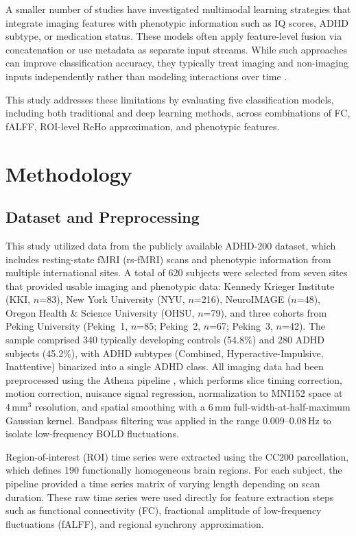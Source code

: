 \documentclass[conference]{IEEEtran}
\begin{document}
A smaller number of studies have investigated multimodal learning strategies that integrate imaging features with phenotypic information such as IQ scores, ADHD subtype, or medication status. These models often apply feature-level fusion via concatenation or use metadata as separate input streams. While such approaches can improve classification accuracy, they typically treat imaging and non-imaging inputs independently rather than modeling interactions over time \cite{taspinar2024, mahmoud2023, elsherif2023}.

This study addresses these limitations by evaluating five classification models, including both traditional and deep learning methods, across combinations of FC, fALFF, ROI-level ReHo approximation, and phenotypic features.

\section{Methodology}

\subsection{Dataset and Preprocessing}
This study utilized data from the publicly available ADHD-200 dataset, which includes resting-state fMRI (rs-fMRI) scans and phenotypic information from multiple international sites. A total of 620 subjects were selected from seven sites that provided usable imaging and phenotypic data: Kennedy Krieger Institute (KKI, $n$=83), New York University (NYU, $n$=216), NeuroIMAGE ($n$=48), Oregon Health \& Science University (OHSU, $n$=79), and three cohorts from Peking University (Peking~1, $n$=85; Peking~2, $n$=67; Peking~3, $n$=42). The sample comprised 340 typically developing controls (54.8\%) and 280 ADHD subjects (45.2\%), with ADHD subtypes (Combined, Hyperactive-Impulsive, Inattentive) binarized into a single ADHD class. All imaging data had been preprocessed using the Athena pipeline \cite{neurobureau}, which performs slice timing correction, motion correction, nuisance signal regression, normalization to MNI152 space at 4\,mm$^3$ resolution, and spatial smoothing with a 6\,mm full-width-at-half-maximum Gaussian kernel. Bandpass filtering was applied in the range 0.009--0.08\,Hz to isolate low-frequency BOLD fluctuations.

Region-of-interest (ROI) time series were extracted using the CC200 parcellation, which defines 190 functionally homogeneous brain regions. For each subject, the pipeline provided a time series matrix of varying length depending on scan duration. These raw time series were used directly for feature extraction steps such as functional connectivity (FC), fractional amplitude of low-frequency fluctuations (fALFF), and regional synchrony approximation.
\end{document}
